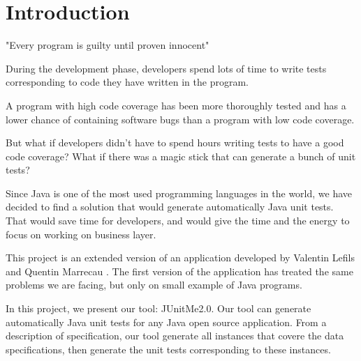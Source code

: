 \chapter*{Introduction}
	\thispagestyle{introduction}
	"Every program is guilty until proven innocent"
	
	During the development phase, developers spend lots of time to write tests corresponding to code they have written in the program.
	
	A program with high code coverage has been more thoroughly tested and has a lower chance of containing software bugs than a program with low code coverage.\cite{CodeCoverage}
	
	But what if developers didn't have to spend hours writing tests to have a good code coverage? What if there was a magic stick that can generate a bunch of unit tests? 
	
Since Java is one of the most used programming languages in the world, we have decided to find a solution that would generate automatically Java unit tests. That would save time for developers, and would give the time and the energy to focus on working on business layer.

This project is an extended version of an application developed by Valentin Lefils and Quentin Marrecau \cite{JUnitMeRapport} \cite{JUnitMeGitHub} . The first version of the application has treated the same problems we are facing, but only on small example of Java programs.

In this project, we present our tool: JUnitMe2.0. Our tool can generate automatically Java unit tests for any Java open source application. From a description of specification, our tool generate all instances that covere the data specifications, then generate the unit tests corresponding to these instances.